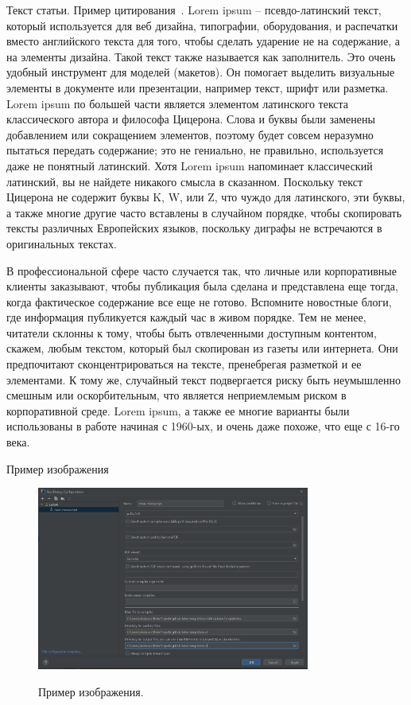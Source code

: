 Текст статьи.
Пример цитирования~\cite{колмогоров1950основные, колмогоров1983комбинаторные, GithubSource_2022, Sloane_theencyclopedia}.
Lorem ipsum – псевдо-латинский текст, который используется для веб дизайна, типографии, оборудования,
и распечатки вместо английского текста для того, чтобы сделать ударение не на содержание,
а на элементы дизайна.
Такой текст также называется как заполнитель.
Это очень удобный инструмент для моделей (макетов).
Он помогает выделить визуальные элементы в документе или презентации, например текст, шрифт или разметка.
Lorem ipsum по большей части является элементом латинского текста классического автора и философа Цицерона.
Слова и буквы были заменены добавлением или сокращением элементов, поэтому будет совсем неразумно пытаться передать содержание;
это не гениально, не правильно, используется даже не понятный латинский.
Хотя Lorem ipsum напоминает классический латинский, вы не найдете никакого смысла в сказанном.
Поскольку текст Цицерона не содержит буквы K, W, или Z, что чуждо для латинского, эти буквы, а также многие другие
часто вставлены в случайном порядке, чтобы скопировать тексты различных Европейских языков, поскольку диграфы
не встречаются в оригинальных текстах.

В профессиональной сфере часто случается так, что личные или корпоративные клиенты заказывают, чтобы публикация была
сделана и представлена еще тогда, когда фактическое содержание все еще не готово.
Вспомните новостные блоги, где информация публикуется каждый час в живом порядке.
Тем не менее, читатели склонны к тому, чтобы быть отвлеченными доступным контентом, скажем, любым текстом, который
был скопирован из газеты или интернета.
Они предпочитают сконцентрироваться на тексте, пренебрегая разметкой и ее элементами.
К тому же, случайный текст подвергается риску быть неумышленно смешным или оскорбительным,
что является неприемлемым риском в корпоративной среде.
Lorem ipsum, а также ее многие варианты были использованы в работе начиная с 1960-ых, и очень даже похоже,
что еще с 16-го века.

Пример изображения
\begin{figure}[H]
    \centering
    \includegraphics[width=0.8\textwidth]{../img/latex_configuration}
    ~\caption{Пример изображения.}\label{fig:figure}
\end{figure}